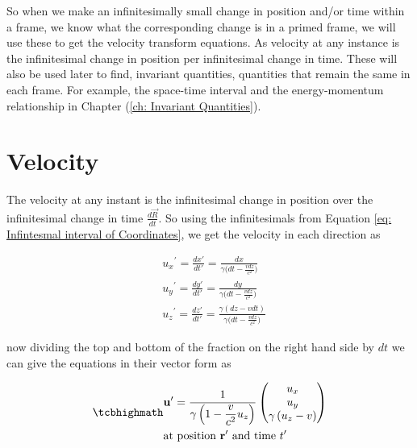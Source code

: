 So when we make an infinitesimally small change in position and/or time within a frame, we know what the corresponding change is in a primed frame, we will use these to get the velocity transform equations.
As velocity at any instance is the infinitesimal change in position per infinitesimal change in time.
These will also be used later to find, invariant quantities, quantities that remain the same in each frame.
For example, the space-time interval and the energy-momentum relationship in Chapter (\ref{ch: Invariant Quantities}).

\section{Velocity} \label{sect: Velocity}

The velocity at any instant is the infinitesimal change in position over the infinitesimal change in time $\frac{d\vec{R}}{dt}$.
So using the infinitesimals from Equation \eqref{eq: Infintesmal interval of Coordinates}, we get the velocity in each direction as

\begin{equation}
	\begin{aligned}
		 & {{u}_{x}}^{'} = \frac{dx{'}}{dt{'}} = \frac{dx}{{\gamma} \bigg(dt-\frac{vdz}{{c}^2}\bigg) }                    \\
		 & {{u}_{y}}^{'} = \frac{dy{'}}{dt{'}} = \frac{dy}{{\gamma} \bigg(dt-\frac{vdz}{{c}^2}\bigg) }                    \\
		 & {{u}_{z}}^{'} = \frac{dz{'}}{dt{'}} = \frac{{\gamma} (dz - {v}dt)}{{\gamma} \bigg(dt-\frac{vdz}{{c}^2}\bigg) }
	\end{aligned}
\end{equation}

now dividing the top and bottom of the fraction on the right hand side by ${dt}$ we can give the equations in their vector form as

\begin{equation}
	\mhl{
		\begin{aligned}
			 & \mathbf{u}{'} = \dfrac{1}{{\gamma}\left(1-\dfrac{v}{{c}^2} {{u}_{z}}\right) }
			\begin{pmatrix}
				{{u}_{x}}                              \\
				{{u}_{y}}                              \\
				{\gamma} \left( {{u}_{z}}- {v} \right) \\
			\end{pmatrix}
			\\
			 & \text{at position ${\mathbf{r}{'}}$ and time ${t{'}}$ }
		\end{aligned}
	}
	\label{eq: velocity transform}
\end{equation}

